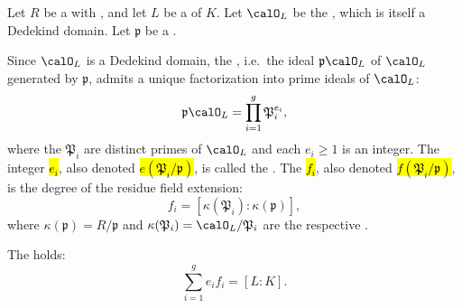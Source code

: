 \begin{definition} \label{definition:prime_decomposition_in_extension_of_dedekind_domains}
    Let $R$ be a  with , and let $L$ be a  of $K$. Let $\calO_L$ be the , which is itself a Dedekind domain. Let $\mathfrak{p}$ be a .

    Since $\calO_L$ is a Dedekind domain, the , i.e.\ the ideal $\mathfrak{p}\calO_L$ of $\calO_L$ generated by $\mathfrak{p}$, admits a unique factorization into prime ideals of $\calO_L$:
    $$\mathfrak{p}\calO_L = \prod_{i=1}^{g} \mathfrak{P}_i^{e_i},$$
    where the $\mathfrak{P}_i$ are distinct primes of $\calO_L$ and each $e_i \ge 1$ is an integer. The integer \hl{$e_i$}, also denoted \hl{$e(\mathfrak{P}_i/\mathfrak{p})$}, is called the . The  \hl{$f_i$}, also denoted \hl{$f(\mathfrak{P}_i/\mathfrak{p})$}, is the degree of the residue field extension:
    $$f_i = [\kappa(\mathfrak{P}_i) : \kappa(\mathfrak{p})],$$
    where $\kappa(\mathfrak{p}) = R/\mathfrak{p}$ and $\kappa(\mathfrak{P}_i) = \calO_L/\mathfrak{P}_i$ are the respective .

    The  holds:
    $$\sum_{i=1}^{g} e_i f_i = [L:K].$$
\end{definition}